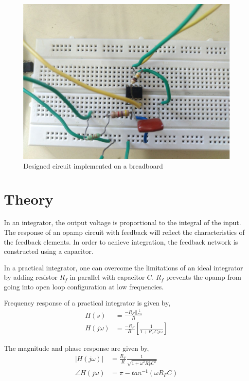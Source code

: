 \documentclass[12pt, titlepage]{article}
\theoremstyle{definition}
\begin{document}
    \begin{figure}
      \includegraphics[scale=0.25]{practical_circuit}
      \caption{Designed circuit implemented on a breadboard}
      \label{fig:practical_circuit}
    \end{figure}

  \newpage
  \section{Theory}
    In an integrator, the output voltage is proportional to the integral of the input.
    The response of an opamp circuit with feedback will reflect the characteristics of the feedback elements.
    In order to achieve integration, the feedback network is constructed using a capacitor.

    In a practical integrator, one can overcome the limitations of an ideal integrator by adding resistor $R_{f}$ in parallel with capacitor $C$.
    $R_{f}$ prevents the opamp from going into open loop configuration at low frequencies.

    Frequency response of a practical integrator is given by,
    \begin{align}\label{eq:freq_response}
      H(s) &= \frac{-R_{F} || \frac{1}{Cs}}{R} \\
      H(j\omega) &= \frac{-R_{F}}{R} \left[ \frac{1}{1+R_{F}Cj\omega} \right]
    \end{align}

    The magnitude and phase response are given by,
    \begin{align*}
    |H(j\omega)| &= \frac{R_{F}}{R}\frac{1}{\sqrt{1+\omega^{2}R_{F}^{2}C^{2}}} \\
    \angle H(j\omega) &= \pi - tan^{-1}(\omega R_{F}C)
    \end{align*}
\end{document}
